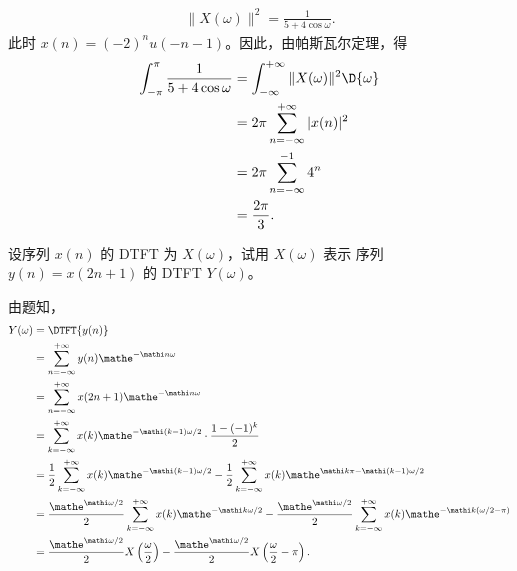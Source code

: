 \begin{solution}
\begin{enumerate}[label=(\arabic*)]
\begin{align*}
                \|X(\omega)\|^2 = \frac{1}{5 + 4\cos\omega}.
            \end{align*}
            此时 $x(n) = (-2)^nu(-n-1)$。因此，由帕斯瓦尔定理，得
            \begin{align*}
                \int_{-\pi}^{\pi}\frac{1}{5 + 4\cos\omega} & = \int_{-\infty}^{+\infty}\|X(\omega)\|^2\D{\omega} \\
                & = 2\pi\sum_{n = -\infty}^{+\infty}|x(n)|^2 \\
                & = 2\pi\sum_{n = -\infty}^{-1}4^n \\
                & = \frac{2\pi}{3}.
            \end{align*}
    \end{enumerate}
\end{solution}

\begin{exercise}
    \label{exercise:x-2n-1}
    设序列 $x(n)$ 的 DTFT 为 $X(\omega)$，试用 $X(\omega)$ 表示
    序列 $y(n) = x(2n + 1)$ 的 DTFT $Y(\omega)$。
\end{exercise}

\begin{solution}
    由题知，
    \begin{align*}
        Y(\omega) & = \DTFT{y(n)} \\
        & = \sum_{n = -\infty}^{+\infty}y(n)\mathe^{-\mathi n\omega} \\
        & = \sum_{n = -\infty}^{+\infty}x(2n + 1)\mathe^{-\mathi n\omega} \\
        & = \sum_{k = -\infty}^{+\infty}x(k)\mathe^{-\mathi (k-1)\omega / 2} \cdot \frac{1 - (-1)^k}{2} \\
        & = \frac{1}{2}\sum_{k = -\infty}^{+\infty}x(k)\mathe^{-\mathi (k-1)\omega / 2}
            - \frac{1}{2}\sum_{k = -\infty}^{+\infty}x(k)\mathe^{\mathi k\pi -\mathi (k-1)\omega / 2} \\
        & = \frac{\mathe^{\mathi\omega/2}}{2}\sum_{k = -\infty}^{+\infty}x(k)\mathe^{-\mathi k \omega / 2}
            - \frac{\mathe^{\mathi\omega/2}}{2}\sum_{k = -\infty}^{+\infty}x(k)\mathe^{-\mathi k (\omega / 2 - \pi)} \\
        & = \frac{\mathe^{\mathi\omega/2}}{2}X\left(\frac{\omega}{2}\right)
            - \frac{\mathe^{\mathi\omega/2}}{2}X\left(\frac{\omega}{2} - \pi\right).
    \end{align*}
\end{solution}

